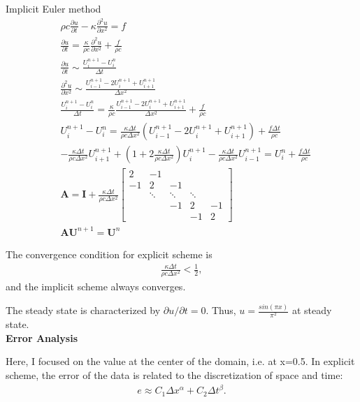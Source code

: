 \documentclass[a4paper,10pt]{article}
\begin{document}
Implicit Euler method
\begin{align*}
& \rho c \frac{\partial u}{\partial t} - \kappa \frac{\partial ^2 u}{\partial x^2} = f \\
& \frac{\partial u}{\partial t} = \frac{\kappa}{\rho c} \frac{\partial ^2 u}{\partial x^2} + \frac{f}{\rho c} \\
& \frac{\partial u}{\partial t} \sim \frac{U_i^{n+1} - U_i^n}{\Delta t} \\
& \frac{\partial ^2 u}{\partial x^2} \sim \frac{U_{i-1}^{n+1} - 2 U_i^{n+1} + U_{i+1}^{n+1}}{\Delta x^2} \\
& \frac{U_i^{n+1} - U_i^n}{\Delta t} = \frac{\kappa}{\rho c} \frac{U_{i-1}^{n+1} - 2 U_i^{n+1} + U_{i+1}^{n+1}}{\Delta x^2} + \frac{f}{\rho c} \\
& U_i^{n+1} - U_i^n = \frac{\kappa \Delta t}{\rho c \Delta x^2} \left( U_{i-1}^{n+1} - 2 U_i^{n+1} + U_{i+1}^{n+1} \right) + \frac{f \Delta t}{\rho c} \\
& - \frac{\kappa \Delta t}{\rho c \Delta x^2} U_{i+1}^{n+1} + \left( 1 + 2 \frac{\kappa \Delta t}{\rho c \Delta x^2} \right) U_i^{n+1} - \frac{\kappa \Delta t}{\rho c \Delta x^2} U_{i-1}^{n+1} = U_i^n + \frac{f \Delta t}{\rho c} \\
& \bm A = \bm I + \frac{\kappa \Delta t}{\rho c \Delta x^2}
\begin{bmatrix}
2  & -1 & \  & \  & \  \\
-1 & 2  & -1 & \  & \  \\
\  & \ddots & \ddots & \ddots & \ \\
\  & \  & -1 & 2  & -1 \\
\  & \  & \  & -1 & 2 
\end{bmatrix} \\
& \bm A \bm U^{n+1} = \bm U^n
\end{align*}

The convergence condition for explicit scheme is 
\begin{align*}
\frac{\kappa \Delta t}{\rho c \Delta x^2} < \frac{1}{2},
\end{align*}
and the implicit scheme always converges.

The steady state is characterized by $\partial u/ \partial t=0$. Thus, $u=\frac{sin(\pi x)}{\pi ^2}$ at steady state.\\

\large \textbf {Error Analysis}

Here, I focused on the value at the center of the domain, i.e. at x=0.5. In explicit scheme, the error of the data is related to the discretization of space and time: 
\begin{align}
e \approx C_1 \Delta x^\alpha + C_2 \Delta t^\beta .
\end{align}
\end{document}
